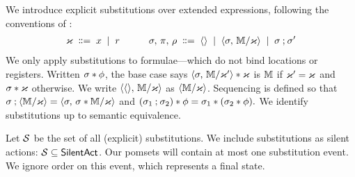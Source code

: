 We introduce explicit substitutions over extended expressions,
following the conventions of \citet{DBLP:conf/icalp/RitterP97}: 
\begin{gather*}
  \aLocReg\BNFDEF \aLoc \BNFSEP \aReg
  \qquad\quad
  \aSub,\,\bSub,\, \SUBDRS{\dEvs} %
  \BNFDEF \SUBEMP \BNFSEP \SUBPAR{\aSub}{\aEExp/\aLocReg}
  \BNFSEP \aSub\SUBSEQ\aSub'
\end{gather*}
We only apply substitutions to formulae---which
do not bind locations or registers. Written $\sigma\mathbin{\ast}\phi$, the
base case says
\begin{math}
  \langle\sigma,\,\mathbb{M}/\varkappa'\rangle\mathbin{\ast}\varkappa
\end{math}
is $\mathbb{M}$ if $\varkappa'=\varkappa$ and $\sigma \mathbin{\ast}\varkappa$ otherwise.
We write $\langle\langle\rangle,\,\mathbb{M}/\varkappa\rangle$ as $\langle\mathbb{M}/\varkappa\rangle$.
Sequencing is defined so that
\begin{math}
  \sigma\mathbin{;}\langle\mathbb{M}/\varkappa\rangle
  \allowbreak= 
  \langle\sigma,\,\sigma\mathbin{\ast}\mathbb{M}/\varkappa\rangle
\end{math}
and
\begin{math}
  (\sigma_1\mathbin{;}\sigma_2)\mathbin{\ast}\phi = \sigma_1\mathbin{\ast}(\sigma_2\mathbin{\ast}\phi).
\end{math}
We identify substitutions up to semantic equivalence.

Let $\mathcal{S}$ be the set of all (explicit) substitutions.  We include
substitutions as silent actions: $\mathcal{S}\subseteq\mathsf{SilentAct}$.
Our pomsets will contain at most one substitution event.  We ignore order on
this event, which represents a final state.

